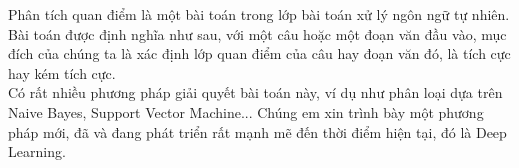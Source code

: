  
\begin{abstracts}         
Phân tích quan điểm là một bài toán trong lớp bài toán xử lý ngôn ngữ tự nhiên. Bài toán được định nghĩa như sau, với một câu hoặc một đoạn văn đầu vào, mục đích của chúng ta là xác định lớp quan điểm của câu hay đoạn văn đó, là tích cực hay kém tích cực. \\
Có rất nhiều phương pháp giải quyết bài toán này, ví dụ như phân loại dựa trên Naive Bayes, Support Vector Machine... Chúng em xin trình bày một phương pháp mới, đã và đang phát triển rất mạnh mẽ đến thời điểm hiện tại, đó là Deep Learning. 

\end{abstracts}
 